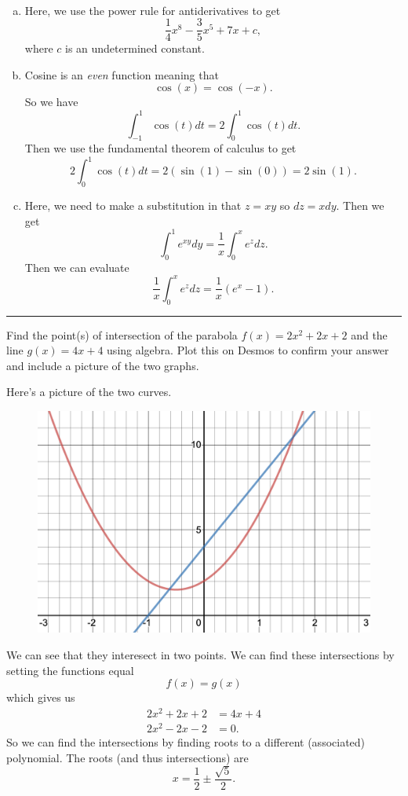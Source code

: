\documentclass[12pt]{article} %
\begin{document}
\begin{solution}
~
\begin{enumerate}[(a)]
    \item Here, we use the power rule for antiderivatives to get
    \[
    \frac{1}{4} x^8 - \frac{3}{5} x^5 + 7x + c,
    \]
    where $c$ is an undetermined constant.
    \item Cosine is an \emph{even} function meaning that
    \[
    \cos(x)=\cos(-x).
    \]
    So we have
    \[
    \int_{-1}^1 \cos(t) dt = 2\int_0^1 \cos(t)dt.
    \]
    Then we use the fundamental theorem of calculus to get
    \[
    2\int_0^1 \cos(t)dt = 2 ( \sin(1)-\sin(0))=2\sin(1).
    \]
    \item Here, we need to make a substitution in that $z=xy$ so $dz=xdy$. Then we get
    \[
    \int_0^1 e^{xy}dy = \frac{1}{x} \int_0^xe^{z}dz.
    \]
    Then we can evaluate
    \[
    \frac{1}{x}\int_0^x e^z dz = \frac{1}{x}\left(e^x-1\right).
    \]
\end{enumerate}
\end{solution}

\hrule

\begin{problem}
    Find the point(s) of intersection of the parabola $f(x)=2x^2+2x+2$ and the line $g(x)=4x+4$ using algebra. Plot this on Desmos to confirm your answer and include a picture of the two graphs.
\end{problem}

\begin{solution}
Here's a picture of the two curves.
\begin{figure}[H]
    \centering
    \includegraphics[width=.8\textwidth]{desmos-graph.png}
\end{figure}
We can see that they interesect in two points. We can find these intersections by setting the functions equal
\[
f(x)=g(x)
\]
which gives us
\begin{align*}
    2x^2+2x+2&=4x+4\\
    2x^2-2x-2&=0.
\end{align*}
So we can find the intersections by finding roots to a different (associated) polynomial. The roots (and thus intersections) are
\[
x=\frac{1}{2}\pm \frac{\sqrt{5}}{2}.
\]
\end{solution}
\end{document}

